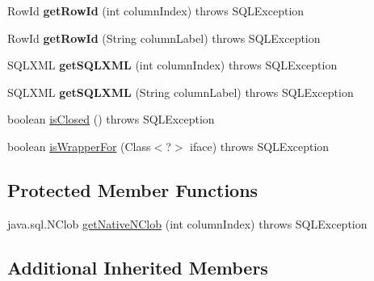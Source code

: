 \begin{DoxyCompactItemize}
\item 
\mbox{\label{classcom_1_1mysql_1_1jdbc_1_1_j_d_b_c4_updatable_result_set_abc81ae8a2df1cb079e49fc6464575a92}} 
Row\+Id {\bfseries get\+Row\+Id} (int column\+Index)  throws S\+Q\+L\+Exception 
\item 
\mbox{\label{classcom_1_1mysql_1_1jdbc_1_1_j_d_b_c4_updatable_result_set_a827468ddea990a8ba3f3ce69093c15c1}} 
Row\+Id {\bfseries get\+Row\+Id} (String column\+Label)  throws S\+Q\+L\+Exception 
\item 
\mbox{\label{classcom_1_1mysql_1_1jdbc_1_1_j_d_b_c4_updatable_result_set_a5be972dc7c56253a249731197959437e}} 
S\+Q\+L\+X\+ML {\bfseries get\+S\+Q\+L\+X\+ML} (int column\+Index)  throws S\+Q\+L\+Exception 
\item 
\mbox{\label{classcom_1_1mysql_1_1jdbc_1_1_j_d_b_c4_updatable_result_set_a426569d212dcb8da287a91cfe708096c}} 
S\+Q\+L\+X\+ML {\bfseries get\+S\+Q\+L\+X\+ML} (String column\+Label)  throws S\+Q\+L\+Exception 
\item 
boolean \mbox{\hyperlink{classcom_1_1mysql_1_1jdbc_1_1_j_d_b_c4_updatable_result_set_a401f43b6faaf6b96e768afa1b3a4e87e}{is\+Closed}} ()  throws S\+Q\+L\+Exception 
\item 
boolean \mbox{\hyperlink{classcom_1_1mysql_1_1jdbc_1_1_j_d_b_c4_updatable_result_set_a550bdf2d1e3a3f3a6d032c50601c0c89}{is\+Wrapper\+For}} (Class$<$?$>$ iface)  throws S\+Q\+L\+Exception 
\end{DoxyCompactItemize}
\subsection*{Protected Member Functions}
\begin{DoxyCompactItemize}
\item 
java.\+sql.\+N\+Clob \mbox{\hyperlink{classcom_1_1mysql_1_1jdbc_1_1_j_d_b_c4_updatable_result_set_ada1fa51ea7ce43ee01de52ff5c0b4275}{get\+Native\+N\+Clob}} (int column\+Index)  throws S\+Q\+L\+Exception 
\end{DoxyCompactItemize}
\subsection*{Additional Inherited Members}


